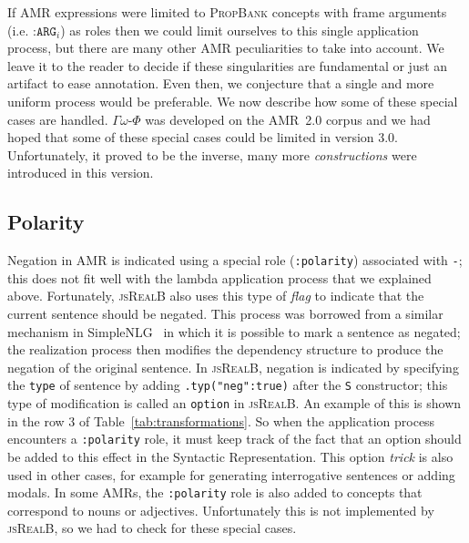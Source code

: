 \documentclass[12pt]{article}
\newcommand{\systeme}[1]{\textsc{#1}}
\newcommand{\jsr}{\systeme{jsRealB}}
\newcommand{\propbank}{\systeme{PropBank}}
\newcommand{\gophi}{$\Gamma\omega$-$\Phi$}
\newcommand{\representation}[1]{\textsf{#1}}
\newcommand{\AMR}{\representation{AMR}}
\newcommand{\syntr}{\representation{Syntactic Representation}}
\begin{document}
If \AMR{} expressions were limited to \propbank{} concepts with frame arguments (i.e. $\texttt{:ARG}_{i}$) as roles then we could limit ourselves to this single application process, but there are many other \AMR{} peculiarities to take into account. We leave it to the reader to decide if these singularities are fundamental or just an artifact to ease annotation. Even then, we conjecture that a single and more uniform process would be preferable. We now describe how some of these special cases are handled. \gophi{} was developed on the AMR~2.0 corpus and we had hoped that some of these special cases could be limited in version 3.0. Unfortunately, it proved to be the inverse, many more \emph{constructions} were introduced in this version. 

\subsection{Polarity} %
\label{sub:polarity}
Negation in \AMR{} is indicated using a special role (\texttt{:polarity}) associated with \texttt{-}; this does not fit well with the lambda application process that we explained above. Fortunately, \jsr{} also uses this type of \emph{flag} to indicate that the current sentence should be negated. This process was borrowed from a similar mechanism in SimpleNLG~\cite{W09-0613} in which it is possible to mark a sentence as negated; the realization process then modifies the dependency structure to produce the negation of the original sentence. In \jsr{}, negation is indicated by specifying the \texttt{type} of sentence by adding \texttt{.typ("neg":true)} after the \texttt{S} constructor; this type of modification is called an \texttt{option} in \jsr{}. An example of this is shown in the row 3 of Table~\ref{tab:transformations}.  So when the application process encounters a \texttt{:polarity} role, it must keep track of the fact that an option should be added to this effect in the \syntr{}. This option \emph{trick} is also used in other cases, for example for generating interrogative sentences or adding modals. In some \AMR{}s, the \texttt{:polarity} role is also added to concepts that correspond to nouns or adjectives. Unfortunately this is not implemented by \jsr{}, so we had to check for these special cases.

\end{document}

